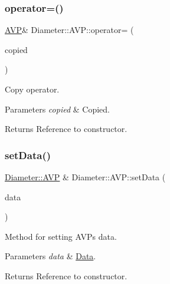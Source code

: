 \subsubsection{\texorpdfstring{operator=()}{operator=()}\hspace{0.1cm}{\footnotesize\ttfamily [2/2]}}
{\footnotesize\ttfamily \hyperlink{classDiameter_1_1AVP}{A\+VP}\& Diameter\+::\+A\+V\+P\+::operator= (\begin{DoxyParamCaption}\item[{const \hyperlink{classDiameter_1_1AVP}{A\+VP} \&}]{copied }\end{DoxyParamCaption})\hspace{0.3cm}{\ttfamily [default]}}



Copy operator. 


\begin{DoxyParams}{Parameters}
{\em copied} & Copied. \\
\hline
\end{DoxyParams}
\begin{DoxyReturn}{Returns}
Reference to constructor. 
\end{DoxyReturn}
\mbox{\label{classDiameter_1_1AVP_a9a16f50e09fa18523f6cc72e372949c8}} 
\subsubsection{\texorpdfstring{set\+Data()}{setData()}}
{\footnotesize\ttfamily \hyperlink{classDiameter_1_1AVP}{Diameter\+::\+A\+VP} \& Diameter\+::\+A\+V\+P\+::set\+Data (\begin{DoxyParamCaption}\item[{const \hyperlink{classDiameter_1_1AVP_1_1Data}{Data} \&}]{data }\end{DoxyParamCaption})}



Method for setting A\+V\+Ps data. 


\begin{DoxyParams}{Parameters}
{\em data} & \hyperlink{classDiameter_1_1AVP_1_1Data}{Data}. \\
\hline
\end{DoxyParams}
\begin{DoxyReturn}{Returns}
Reference to constructor. 
\end{DoxyReturn}
\mbox{\label{classDiameter_1_1AVP_a1c275a3973c1d871e0653a1ab5c54499}} 
